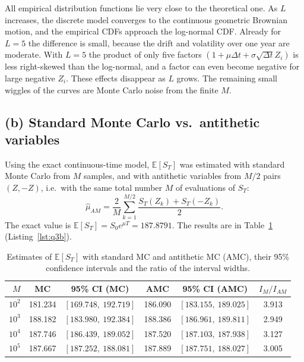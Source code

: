 \documentclass[11pt,a4paper]{article}
\begin{document}
All empirical distribution functions lie very close to the theoretical one. As $L$ increases, the
discrete model converges to the continuous geometric Brownian motion, and the empirical CDFs
approach the log-normal CDF. Already for $L = 5$ the difference is small, because the drift and
volatility over one year are moderate. With $L = 5$ the product of only five factors
$(1 + \mu\Delta t + \sigma\sqrt{\Delta t}Z_i)$ is less right-skewed than the log-normal, and a
factor can even become negative for large negative $Z_i$. These effects disappear as $L$ grows.
The remaining small wiggles of the curves are Monte Carlo noise from the finite $M$.

\subsection*{(b) Standard Monte Carlo vs.\ antithetic variables}

Using the exact continuous-time model, $\mathbb E[S_T]$ was estimated with standard Monte Carlo
from $M$ samples, and with antithetic variables from $M/2$ pairs $(Z, -Z)$, i.e.\ with the same
total number $M$ of evaluations of $S_T$:
\[
  \hat\mu_{AM} = \frac{2}{M}\sum_{k=1}^{M/2} \frac{S_T(Z_k) + S_T(-Z_k)}{2}.
\]
The exact value is $\mathbb E[S_T] = S_0 e^{\mu T} = 187.8791$. The results are in
Table~\ref{tab:q3b} (Listing~\ref{lst:q3b}).

\begin{table}[H]
  \centering
  \small
  \begin{tabular}{rccccc}
    \toprule
    $M$ & MC & 95\% CI (MC) & AMC & 95\% CI (AMC) & $I_M / I_{AM}$ \\
    \midrule
    $10^2$ & 181.234 & $[169.748,\ 192.719]$ & 186.090 & $[183.155,\ 189.025]$ & 3.913 \\
    $10^3$ & 188.182 & $[183.980,\ 192.384]$ & 188.386 & $[186.961,\ 189.811]$ & 2.949 \\
    $10^4$ & 187.746 & $[186.439,\ 189.052]$ & 187.520 & $[187.103,\ 187.938]$ & 3.127 \\
    $10^5$ & 187.667 & $[187.252,\ 188.081]$ & 187.889 & $[187.751,\ 188.027]$ & 3.005 \\
    \bottomrule
  \end{tabular}
  \caption{Estimates of $\mathbb E[S_T]$ with standard MC and antithetic MC (AMC), their 95\%
  confidence intervals and the ratio of the interval widths.}
  \label{tab:q3b}
\end{table}
\end{document}
